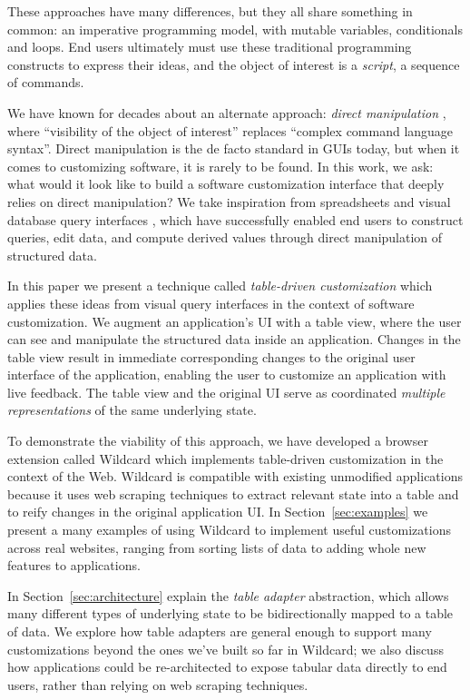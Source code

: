 \documentclass[sigplan,10pt,anonymous,review]{acmart}
\begin{document}
These approaches have many differences, but they all share something in
common: an imperative programming model, with mutable variables,
conditionals and loops. End users ultimately must use these traditional
programming constructs to express their ideas, and the object of
interest is a \emph{script}, a sequence of commands.

We have known for decades about an alternate approach: \emph{direct
manipulation} \citep{shneiderman1983}, where ``visibility of the object
of interest'' replaces ``complex command language syntax''. Direct
manipulation is the de facto standard in GUIs today, but when it comes
to customizing software, it is rarely to be found. In this work, we ask:
what would it look like to build a software customization interface that
deeply relies on direct manipulation? We take inspiration from
spreadsheets and visual database query interfaces
\citep{2020a, bakke2016}, which have successfully enabled end users to
construct queries, edit data, and compute derived values through direct
manipulation of structured data.

In this paper we present a technique called \emph{table-driven
customization} which applies these ideas from visual query interfaces in
the context of software customization. We augment an application's UI
with a table view, where the user can see and manipulate the structured
data inside an application. Changes in the table view result in
immediate corresponding changes to the original user interface of the
application, enabling the user to customize an application with live
feedback. The table view and the original UI serve as coordinated
\emph{multiple representations} of the same underlying state.

To demonstrate the viability of this approach, we have developed a
browser extension called Wildcard which implements table-driven
customization in the context of the Web. Wildcard is compatible with
existing unmodified applications because it uses web scraping techniques
to extract relevant state into a table and to reify changes in the
original application UI. In Section~\ref{sec:examples} we present a many
examples of using Wildcard to implement useful customizations across
real websites, ranging from sorting lists of data to adding whole new
features to applications.

In Section~\ref{sec:architecture} explain the \emph{table adapter}
abstraction, which allows many different types of underlying state to be
bidirectionally mapped to a table of data. We explore how table adapters
are general enough to support many customizations beyond the ones we've
built so far in Wildcard; we also discuss how applications could be
re-architected to expose tabular data directly to end users, rather than
relying on web scraping techniques.
\end{document}

